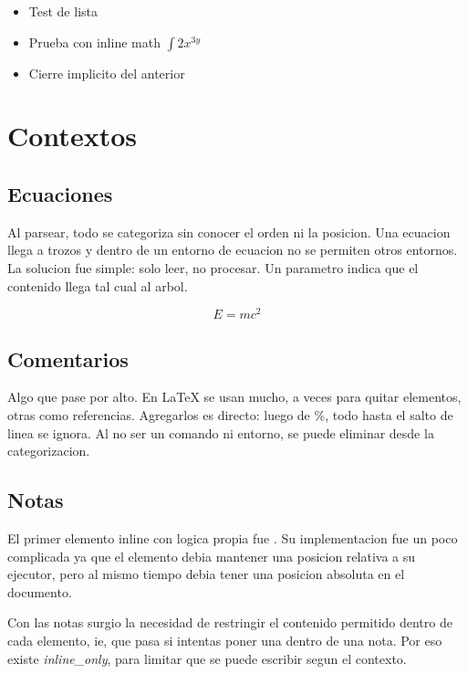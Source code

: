 \documentclass{article}
\begin{document}
  \begin{itemize}
      \item Test de lista
      \item Prueba con inline math $\int 2x^{3y}$
      \item Cierre implicito del anterior
  \end{itemize}


  \chapter{ Contextos }

  \section{ Ecuaciones }

  Al parsear, todo se categoriza sin conocer el orden ni la posicion. Una ecuacion
  llega a trozos y dentro de un entorno de ecuacion no se permiten otros entornos.
  La solucion fue simple: solo leer, no procesar. Un parametro
  indica que el contenido llega tal cual al arbol.

  \begin{equation}
      E = mc^2
  \end{equation}

  \section{ Comentarios }

  Algo que pase por alto. En LaTeX se usan mucho, a veces para quitar elementos,
  otras como referencias. Agregarlos es directo: luego de \%, todo hasta el
  salto de linea se ignora. Al no ser un comando ni entorno, se puede eliminar
  desde la categorizacion.

  \section{ Notas }

  El primer elemento inline con logica propia fue
  .
  Su implementacion fue un poco complicada ya que el elemento debia mantener
  una posicion relativa a su ejecutor, pero al mismo tiempo debia tener una
  posicion absoluta en el documento.

  Con las notas surgio la necesidad de restringir el contenido permitido
  dentro de cada elemento, ie, que pasa si intentas poner una
  dentro de una nota. Por eso existe \textit{inline\_only}, para limitar
  que se puede escribir segun el contexto.
\end{document}
